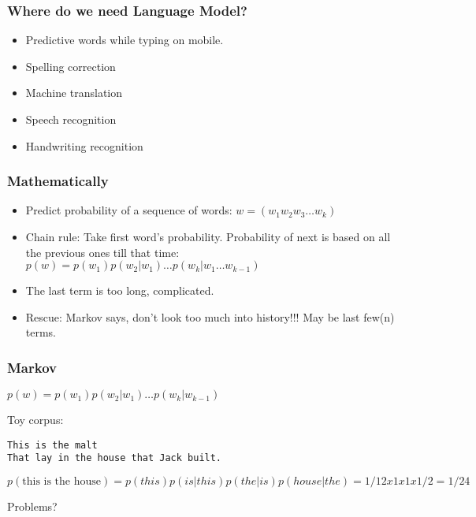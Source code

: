 \begin{frame}[fragile]
  \frametitle{Where do we need Language Model?}
  \begin{itemize}
  \item Predictive words while typing on mobile.
  \item Spelling correction
  \item Machine translation
  \item Speech recognition
  \item Handwriting recognition
  	  \end{itemize}
  	  
 
 \end{frame} 


\begin{frame}[fragile]
  \frametitle{Mathematically}
  \begin{itemize}
  \item Predict probability of a sequence of words: $w = (w_1w_2w_3 \ldots w_k)$ 
  \item Chain rule: Take first word's probability. Probability of next is based on all the previous ones till that time: $p(w) = p(w_1 )p(w_2 | w_1 ) \ldots  p(w_k | w_1  \ldots w_{k-1} )$
  \item The last term is too long, complicated.
  \item Rescue: Markov says, don't look too much into history!!! May be last few(n) terms.
  	  \end{itemize}
  	  
 
 \end{frame} 

\begin{frame}[fragile]
  \frametitle{Markov}
$p(w) = p(w_1 )p(w_2 | w_1 ) \ldots  p(w_k | w_{k-1} )$

Toy corpus: 
  \begin{lstlisting}
This is the malt
That lay in the house that Jack built.
 \end{lstlisting}
  	  
$p(\text{this is the house}) = p(this) p(is| this) p(the| is) p(house| the) = 1/12 x 1 x 1 x 1/2 = 1/24$
 
 Problems?
 \end{frame} 

